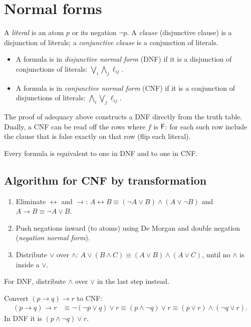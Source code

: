 \section{Normal forms}

\begin{definition}
A \emph{literal} is an atom $p$ or its negation $\neg p$. A \emph{clause} (disjunctive
clause) is a disjunction of literals; a \emph{conjunctive clause} is a conjunction of
literals.
\begin{itemize}
  \item A formula is in \emph{disjunctive normal form} (DNF) if it is a disjunction of
        conjunctions of literals: $\bigvee_i\bigwedge_j \ell_{ij}$.
  \item A formula is in \emph{conjunctive normal form} (CNF) if it is a conjunction of
        disjunctions of literals: $\bigwedge_i\bigvee_j \ell_{ij}$.
\end{itemize}
\end{definition}

The proof of adequacy above constructs a DNF directly from the truth table. Dually, a CNF
can be read off the rows where $f$ is $\mathsf{F}$: for each such row include the clause that
is false exactly on that row (flip each literal).

\begin{theorem}
Every formula is equivalent to one in DNF and to one in CNF.
\end{theorem}

\subsection{Algorithm for CNF by transformation}
\begin{enumerate}
  \item Eliminate $\leftrightarrow$ and $\to$: $A\leftrightarrow B\equiv(\neg A\lor B)\land(A\lor\neg B)$
        and $A\to B\equiv\neg A\lor B$.
  \item Push negations inward (to atoms) using De Morgan and double negation
        (\emph{negation normal form}).
  \item Distribute $\lor$ over $\land$: $A\lor(B\land C)\equiv(A\lor B)\land(A\lor C)$,
        until no $\land$ is inside a $\lor$.
\end{enumerate}
For DNF, distribute $\land$ over $\lor$ in the last step instead.

\begin{example}
Convert $(p\to q)\to r$ to CNF:
\begin{align*}
(p\to q)\to r &\equiv \neg(\neg p\lor q)\lor r
  \equiv (p\land\neg q)\lor r
  \equiv (p\lor r)\land(\neg q\lor r).
\end{align*}
In DNF it is $(p\land\neg q)\lor r$.
\end{example}

